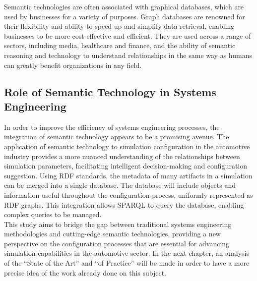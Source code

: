     Semantic technologies are often associated with graphical databases, which are used by businesses for a variety of purposes. Graph databases are renowned for their flexibility and ability to speed up and simplify data retrieval, enabling businesses to be more cost-effective and efficient. They are used across a range of sectors, including media, healthcare and finance, and the ability of semantic reasoning and technology to understand relationships in the same way as humans can greatly benefit organizations in any field.\\





\subsection{Role of Semantic Technology in Systems Engineering}
In order to improve the efficiency of systems engineering processes, the integration of semantic technology appears to be a promising avenue. The application of semantic technology to simulation configuration in the automotive industry provides a more nuanced understanding of the relationships between simulation parameters, facilitating intelligent decision-making and configuration suggestion. Using RDF standards, the metadata of many artifacts in a simulation can be merged into a single database. The database will include objects and information useful throughout the configuration process, uniformly represented as RDF graphs. This integration allows SPARQL to query the database, enabling complex queries to be managed.\\

This study aims to bridge the gap between traditional systems engineering methodologies and cutting-edge semantic technologies, providing a new perspective on the configuration processes that are essential for advancing simulation capabilities in the automotive sector. In the next chapter, an analysis of the “State of the Art” and “of Practice” will be made in order to have a more precise idea of the work already done on this subject.











